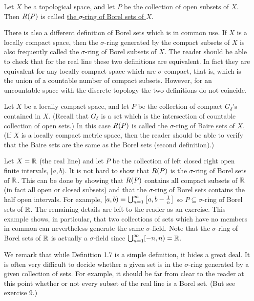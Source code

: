 \begin{example}
Let $X$ be a topological space, and let $P$ be the collection of open subsets of $X$. Then $R(P)$ is called \underline{the $\sigma$-ring of Borel sets of $X$}.
\end{example}

There is also a different definition of Borel sets which is in common use. If $X$ is a locally compact space, then the $\sigma$-ring generated by the compact subsets of $X$ is also frequently called the $\sigma$-ring of Borel subsets of $X$. The reader should be able to check that for the real line these two definitions are equivalent. In fact they are equivalent for any locally compact space which are $\sigma$-compact, that is, which is the union of a countable number of compact subsets. However, for an uncountable space with the discrete topology the two definitions do not coincide.

\begin{example}
Let $X$ be a locally compact space, and let $P$ be the collection of compact $G_\delta$'s contained in $X$. (Recall that  $G_\delta$ is a set which is the intersection of countable collection of open sets.) In this case $R(P)$ is called \underline{the $\sigma$-ring of Baire sets of $X$.} (If $X$ is a locally compact metric space, then the reader should be able to verify that the Baire sets are the same as the Borel sets (second definition).)
\end{example}

\begin{example}
Let $X=\mathbb{R}$ (the real line) and let $P$ be the collection of left closed right open finite intervals, $[a,b)$. It is not hard to show that $R(P)$ is the $\sigma$-ring of Borel sets of $\mathbb{R}$. This can be done by showing that $R(P)$ contains all compact subsets of $\mathbb{R}$ (in fact all open or closed subsets) and that the $\sigma$-ring of Borel sets contains the half open intervals. For example, $[a,b)=\bigcup_{n=1}^\infty\left[a,b-\frac1n\right]$ so $P\subseteq\sigma$-ring of Borel sets of $\mathbb{R}$. The remaining details are left to the reader as an exercise. This example shows, in particular, that two collections of sets which have no members in common can nevertheless generate the same $\sigma$-field. Note that the $\sigma$-ring of Borel sets of $\mathbb{R}$ is actually a $\sigma$-field since $\bigcup_{n=1}^\infty[-n,n)=\mathbb{R}$.
\end{example}

We remark that while Definition 1.7 is a simple definition, it hides a great deal. It is often very difficult to decide whether a given set is in the $\sigma$-ring generated by a given collection of sets. For example, it should be far from clear to the reader at this point whether or not every subset of the real line is a Borel set. (But see exercise 9.) %



